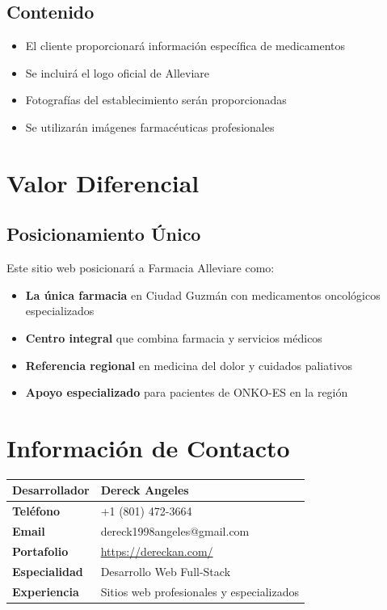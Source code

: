 \documentclass[12pt,a4paper]{article}
\begin{document}
\subsection{Contenido}
\begin{itemize}
    \item El cliente proporcionará información específica de medicamentos
    \item Se incluirá el logo oficial de Alleviare
    \item Fotografías del establecimiento serán proporcionadas
    \item Se utilizarán imágenes farmacéuticas profesionales
\end{itemize}

\section{Valor Diferencial}

\subsection{Posicionamiento Único}
Este sitio web posicionará a Farmacia Alleviare como:

\begin{itemize}
    \item \textbf{La única farmacia} en Ciudad Guzmán con medicamentos oncológicos especializados
    \item \textbf{Centro integral} que combina farmacia y servicios médicos
    \item \textbf{Referencia regional} en medicina del dolor y cuidados paliativos
    \item \textbf{Apoyo especializado} para pacientes de ONKO-ES en la región
\end{itemize}

\section{Información de Contacto}

\begin{center}
\begin{tabularx}{0.8\textwidth}{|l|X|}
\hline
\textbf{Desarrollador} & \textbf{Dereck Angeles} \\
\hline
\textbf{Teléfono} & +1 (801) 472-3664 \\
\hline
\textbf{Email} & dereck1998angeles@gmail.com \\
\hline
\textbf{Portafolio} & \url{https://dereckan.com/} \\
\hline
\textbf{Especialidad} & Desarrollo Web Full-Stack \\
\hline
\textbf{Experiencia} & Sitios web profesionales y especializados \\
\hline
\end{tabularx}
\end{center}
\end{document}
